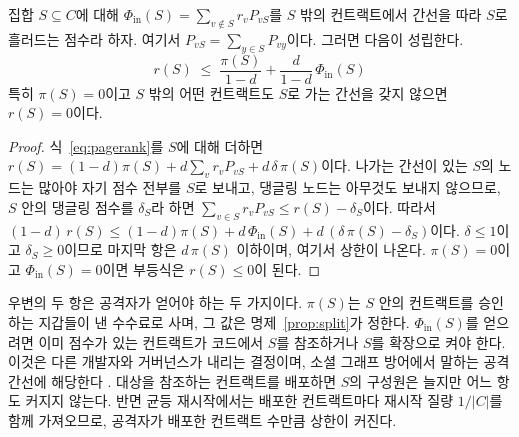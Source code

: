 \begin{proposition}
\label{prop:region}
집합 $S\subseteq C$에 대해 $\Phi_{\mathrm{in}}(S)=\sum_{v\notin S}r_v P_{vS}$를 $S$ 밖의 컨트랙트에서 간선을 따라 $S$로 흘러드는 점수라 하자. 여기서 $P_{vS}=\sum_{y\in S}P_{vy}$이다. 그러면 다음이 성립한다.
\begin{equation}
r(S)\;\leq\;\frac{\pi(S)}{1-d}+\frac{d}{1-d}\,\Phi_{\mathrm{in}}(S)
\end{equation}
특히 $\pi(S)=0$이고 $S$ 밖의 어떤 컨트랙트도 $S$로 가는 간선을 갖지 않으면 $r(S)=0$이다.
\end{proposition}

\begin{proof}
식~\eqref{eq:pagerank}를 $S$에 대해 더하면 $r(S)=(1-d)\pi(S)+d\sum_{v}r_vP_{vS}+d\,\delta\,\pi(S)$이다. 나가는 간선이 있는 $S$의 노드는 많아야 자기 점수 전부를 $S$로 보내고, 댕글링 노드는 아무것도 보내지 않으므로, $S$ 안의 댕글링 점수를 $\delta_S$라 하면 $\sum_{v\in S}r_vP_{vS}\leq r(S)-\delta_S$이다. 따라서 $(1-d)\,r(S)\leq(1-d)\pi(S)+d\,\Phi_{\mathrm{in}}(S)+d\,(\delta\,\pi(S)-\delta_S)$이다. $\delta\leq1$이고 $\delta_S\geq0$이므로 마지막 항은 $d\,\pi(S)$ 이하이며, 여기서 상한이 나온다. $\pi(S)=0$이고 $\Phi_{\mathrm{in}}(S)=0$이면 부등식은 $r(S)\leq 0$이 된다.
\end{proof}

우변의 두 항은 공격자가 얻어야 하는 두 가지이다. $\pi(S)$는 $S$ 안의 컨트랙트를 승인하는 지갑들이 낸 수수료로 사며, 그 값은 명제~\ref{prop:split}가 정한다. $\Phi_{\mathrm{in}}(S)$를 얻으려면 이미 점수가 있는 컨트랙트가 코드에서 $S$를 참조하거나 $S$를 확장으로 켜야 한다. 이것은 다른 개발자와 거버넌스가 내리는 결정이며, 소셜 그래프 방어에서 말하는 공격 간선에 해당한다 \cite{yu2006sybilguard,cao2012sybilrank}. 대상을 참조하는 컨트랙트를 배포하면 $S$의 구성원은 늘지만 어느 항도 커지지 않는다. 반면 균등 재시작에서는 배포한 컨트랙트마다 재시작 질량 $1/|C|$를 함께 가져오므로, 공격자가 배포한 컨트랙트 수만큼 상한이 커진다.

